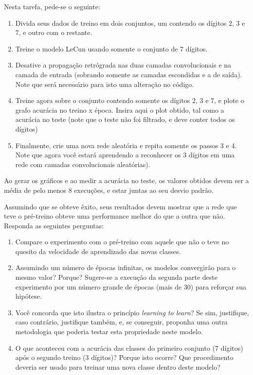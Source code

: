 \documentclass[12pt, a4paper]{article}
\begin{document}
Nesta tarefa, pede-se o seguinte:
\begin{enumerate}
\item Divida seus dados de treino em dois conjuntos, um contendo os dígitos 2, 3 e 7, e outro com o restante.
\item Treine o modelo LeCun usando somente o conjunto de 7 dígitos.
\item Desative a propagação retrógrada nas duas camadas convolucionais e na camada de entrada (sobrando somente as camadas escondidas e a de saída). Note que será necessário para isto uma alteração no código.
\item Treine agora sobre o conjunto contendo somente os dígitos 2, 3 e 7, e plote o grafo acurácia no treino x época. Insira aqui o plot obtido, tal como a acurácia no teste (note que o teste não foi filtrado, e deve conter todos os dígitos)
\item Finalmente, crie uma nova rede aleatória e repita somente os passos 3 e 4. Note que agora você estará aprendendo a reconhecer os 3 dígitos em uma rede com camadas convolucionais aleatórias).
\end{enumerate}

Ao gerar os gráficos e ao medir a acurácia no teste, os valores obtidos devem ser a média de pelo menos 8 execuções, e estar juntas ao seu desvio padrão.

Assumindo que se obteve êxito, seus resultados devem mostrar que a rede que teve o pré-treino obteve uma performance melhor do que a outra que não. Responda as seguintes perguntas:
\begin{enumerate}
\item Compare o experimento com o pré-treino com aquele que não o teve no quesito da velocidade de aprendizado das novas classes.
\item Assumindo um número de épocas infinitas, os modelos convergirão para o mesmo valor? Porque? Sugere-se a execução da segunda parte deste experimento por um número grande de épocas (mais de 30) para reforçar sua hipótese.  
\item Você concorda que isto ilustra o princípio \emph{learning to learn}? Se sim, justifique, caso contrário, justifique também, e, se conseguir, proponha uma outra metodologia que poderia testar esta propriedade neste modelo.
\item O que aconteceu com a acurácia das classes do primeiro conjunto (7 dígitos) após o segundo treino (3 dígitos)? Porque isto ocorre? Que procedimento deveria ser usado para treinar uma nova classe dentro deste modelo?
\end{enumerate} 
\end{document}
